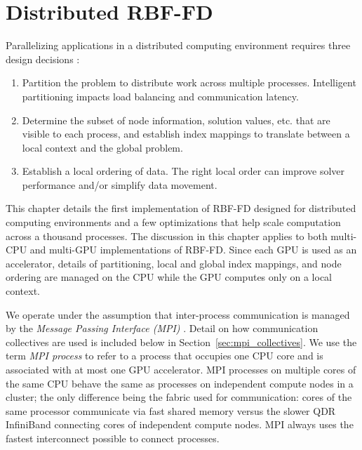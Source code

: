 \documentclass{report}
\begin{document}
\fi


\chapter{Distributed RBF-FD}
\label{chap:distributed_rbffd}

Parallelizing applications in a distributed computing environment requires three
design decisions \cite{Saad2003}: 
\begin{enumerate} 
\item Partition the problem to distribute work across multiple processes. Intelligent partitioning
impacts load balancing and communication latency.
\item Determine the subset of node information,
solution values, etc. that are visible to each process, and establish index mappings to translate between a local context and the global problem. 
\item Establish a local ordering of data. The right local order can improve solver performance and/or simplify data movement. %
\end{enumerate}

This chapter details the first implementation of RBF-FD designed for distributed computing environments and a few optimizations that help scale computation across a thousand processes. The discussion in this chapter applies to both multi-CPU and multi-GPU implementations of RBF-FD. Since each GPU is used as an accelerator, details of partitioning, local and global index mappings, and node ordering are managed on the CPU while the GPU computes only on a local context.  

We operate under the assumption that inter-process communication is managed by the \emph{Message Passing Interface (MPI)} \cite{MPI}. Detail on how communication collectives are used is included below in Section~\ref{sec:mpi_collectives}. We use the term \emph{MPI process} to refer to a process that occupies one CPU core and is associated with at most one GPU accelerator. MPI processes on multiple cores of the same CPU behave the same as processes on independent compute nodes in a cluster; the only difference being the fabric used for communication: cores of the same processor communicate via fast shared memory versus the slower QDR InfiniBand connecting cores of independent compute nodes. MPI always uses the fastest interconnect possible to connect processes. 
\end{document}
